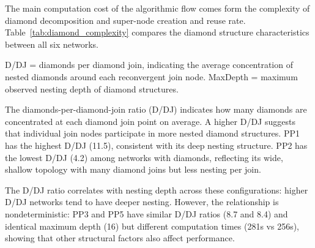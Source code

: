 \documentclass[preprint,12pt]{elsarticle}
\begin{document}
The main computation cost of the algorithmic flow comes form the complexity of diamond decomposition and super-node creation and reuse rate.  
Table~\ref{tab:diamond_complexity} compares the diamond structure characteristics between all six networks. 

\begin{table}[ht]
\caption{Diamond-structure complexity metrics for the derived drone network DAGs.}
\label{tab:diamond_complexity}
\centering
{}
\begin{minipage}{\textwidth}
\footnotesize
D/DJ = diamonds per diamond join, indicating the average concentration of nested diamonds around each reconvergent join node. MaxDepth = maximum observed nesting depth of diamond structures.
\end{minipage}
\end{table}


The diamonds-per-diamond-join ratio (D/DJ) indicates how many diamonds are concentrated at each diamond join point on average. A higher D/DJ suggests that individual join nodes participate in more nested diamond structures. PP1 has the highest D/DJ (11.5), consistent with its deep nesting structure. PP2 has the lowest D/DJ (4.2) among networks with diamonds, reflecting its wide, shallow topology with many diamond joins but less nesting per join.

The D/DJ ratio correlates with nesting depth across these configurations: higher D/DJ networks tend to have deeper nesting. However, the relationship is nondeterministic: PP3 and PP5 have similar D/DJ ratios (8.7 and 8.4) and identical maximum depth (16) but different computation times (281s vs 256s), showing that other structural factors also affect performance.
\end{document}
